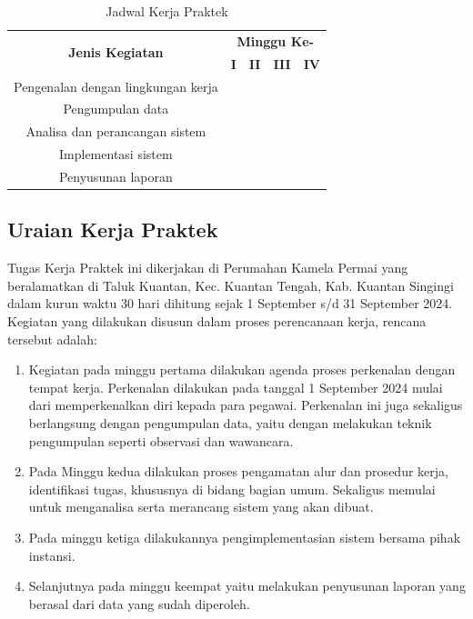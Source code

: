 \begin{table}[H]
\centering
\captionsetup{position=above} %
\caption{Jadwal Kerja Praktek}
\begin{tabular}{|c|c|c|c|c|}
\hline
\multirow{2}{*}{\textbf{Jenis Kegiatan}} & \multicolumn{4}{c|}{\textbf{Minggu Ke-}} \\ \cline{2-5} 
                                         & \textbf{I} & \textbf{II} & \textbf{III} & \textbf{IV} \\ \hline
Pengenalan dengan lingkungan kerja        & \cellcolor[HTML]{3166FF} & \cellcolor[HTML]{FFFFFF} & \cellcolor[HTML]{FFFFFF} & \cellcolor[HTML]{FFFFFF} \\ \hline
Pengumpulan data                          & \cellcolor[HTML]{3166FF} & \cellcolor[HTML]{3166FF} & \cellcolor[HTML]{FFFFFF} & \cellcolor[HTML]{FFFFFF} \\ \hline
Analisa dan perancangan sistem            & \cellcolor[HTML]{FFFFFF} & \cellcolor[HTML]{3166FF} & \cellcolor[HTML]{3166FF} & \cellcolor[HTML]{FFFFFF} \\ \hline
Implementasi sistem                       & \cellcolor[HTML]{FFFFFF} & \cellcolor[HTML]{FFFFFF} & \cellcolor[HTML]{3166FF} & \cellcolor[HTML]{3166FF} \\ \hline
Penyusunan laporan                        & \cellcolor[HTML]{FFFFFF} & \cellcolor[HTML]{FFFFFF} & \cellcolor[HTML]{FFFFFF} & \cellcolor[HTML]{3166FF} \\ \hline
\end{tabular}
\end{table}

\subsection{Uraian Kerja Praktek}
Tugas Kerja Praktek ini dikerjakan di Perumahan Kamela Permai yang beralamatkan di Taluk Kuantan, Kec. Kuantan Tengah, Kab. Kuantan Singingi dalam kurun waktu 30 hari dihitung sejak 1 September s/d 31 September 2024. Kegiatan yang dilakukan disusun dalam proses perencanaan kerja, rencana tersebut adalah:
\begin{enumerate}
    \item Kegiatan pada minggu pertama dilakukan agenda proses perkenalan dengan tempat kerja. Perkenalan dilakukan pada tanggal 1 September 2024 mulai dari memperkenalkan diri kepada para pegawai. Perkenalan ini juga sekaligus berlangsung dengan pengumpulan data, yaitu dengan melakukan teknik pengumpulan seperti observasi dan wawancara.
    \item Pada Minggu kedua dilakukan proses pengamatan alur dan prosedur kerja, identifikasi tugas, khususnya di bidang bagian umum. Sekaligus memulai untuk menganalisa serta merancang sistem yang akan dibuat.
    \item  Pada minggu ketiga dilakukannya pengimplementasian sistem bersama pihak instansi.
    \item  Selanjutnya pada minggu keempat yaitu melakukan penyusunan laporan yang berasal dari data yang sudah diperoleh.
\end{enumerate}
